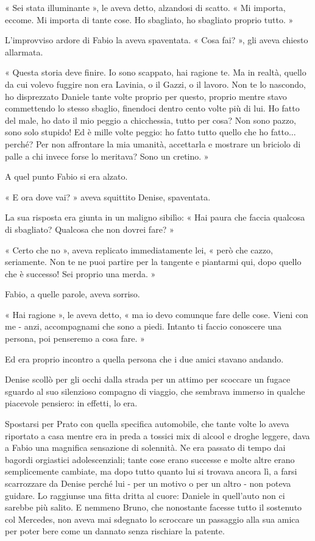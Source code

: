 « Sei stata illuminante », le aveva detto, alzandosi di scatto. « Mi importa, eccome. Mi importa di tante cose. Ho sbagliato, ho sbagliato proprio tutto. »

L'improvviso ardore di Fabio la aveva spaventata. « Cosa fai? », gli aveva chiesto allarmata.

« Questa storia deve finire. Io sono scappato, hai ragione te. Ma in realtà, quello da cui volevo fuggire non era Lavinia, o il Gazzi, o il lavoro. Non te lo nascondo, ho disprezzato Daniele tante volte proprio per questo, proprio mentre stavo commettendo lo stesso sbaglio, finendoci dentro cento volte più di lui. Ho fatto del male, ho dato il mio peggio a chicchessia, tutto per cosa? Non sono pazzo, sono solo stupido! Ed è mille volte peggio: ho fatto tutto quello che ho fatto... perché? Per non affrontare la mia umanità, accettarla e mostrare un briciolo di palle a chi invece forse lo meritava? Sono un cretino. »

A quel punto Fabio si era alzato.

« E ora dove vai? » aveva squittito Denise, spaventata.

La sua risposta era giunta in un maligno sibilìo: « Hai paura che faccia qualcosa di sbagliato? Qualcosa che non dovrei fare? »

« Certo che no », aveva replicato immediatamente lei, « però che cazzo, seriamente. Non te ne puoi partire per la tangente e piantarmi qui, dopo quello che è successo! Sei proprio una merda. »

Fabio, a quelle parole, aveva sorriso.

« Hai ragione », le aveva detto, « ma io devo comunque fare delle cose. Vieni con me - anzi, accompagnami che sono a piedi. Intanto ti faccio conoscere una persona, poi penseremo a cosa fare. »

Ed era proprio incontro a quella persona che i due amici stavano andando.

Denise scollò per gli occhi dalla strada per un attimo per scoccare un fugace sguardo al suo silenzioso compagno di viaggio, che sembrava immerso in qualche piacevole pensiero: in effetti, lo era.

Spostarsi per Prato con quella specifica automobile, che tante volte lo aveva riportato a casa mentre era in preda a tossici mix di alcool e droghe leggere, dava a Fabio una magnifica sensazione di solennità. Ne era passato di tempo dai bagordi orgiastici adolescenziali; tante cose erano successe e molte altre erano semplicemente cambiate, ma dopo tutto quanto lui si trovava ancora lì, a farsi scarrozzare da Denise perché lui - per un motivo o per un altro - non poteva guidare. Lo raggiunse una fitta dritta al cuore: Daniele in quell'auto non ci sarebbe più salito. E nemmeno Bruno, che nonostante facesse tutto il sostenuto col Mercedes, non aveva mai sdegnato lo scroccare un passaggio alla sua amica per poter bere come un dannato senza rischiare la patente.

